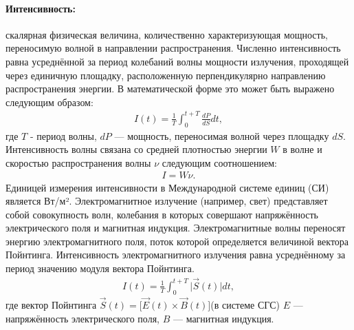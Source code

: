 \documentclass[__minimum__.tex]{subfiles}
\begin{document}
\paragraph{Интенсивность:} скалярная физическая величина, количественно характеризующая мощность, переносимую волной в направлении распространения. Численно интенсивность равна усреднённой за период колебаний волны мощности излучения, проходящей через единичную площадку, расположенную перпендикулярно направлению распространения энергии. В математической форме это может быть выражено следующим образом:
\begin{gather*}
    I(t) = \frac{1}{T}\int_0^{t+T}\frac{dP}{dS}dt,
\end{gather*}
где $T$ - период волны, $dP$ — мощность, переносимая волной через площадку $dS$.
Интенсивность волны связана со средней плотностью энергии $W$ в волне и скоростью распространения волны $\nu$ следующим соотношением:
\begin{gather*}
    I = W\nu.
\end{gather*}
Единицей измерения интенсивности в Международной системе единиц (СИ) является Вт/м².
Электромагнитное излучение (например, свет) представляет собой совокупность волн, колебания в которых совершают напряжённость электрического поля и магнитная индукция. Электромагнитные волны переносят энергию электромагнитного поля, поток которой определяется величиной вектора Пойнтинга. Интенсивность электромагнитного излучения равна усреднённому за период значению модуля вектора Пойнтинга.
\begin{gather*}
    I(t)=\frac{1}{T}\int_0^{t+T}\big|\vec{S}(t)\big|dt,
\end{gather*}
где вектор Пойнтинга $\vec{S}(t) = \big[\vec{E}(t)\times\vec{B}(t)\big]$(в системе СГС) $E$ — напряжённость электрического поля, $B$ — магнитная индукция.
\end{document}
